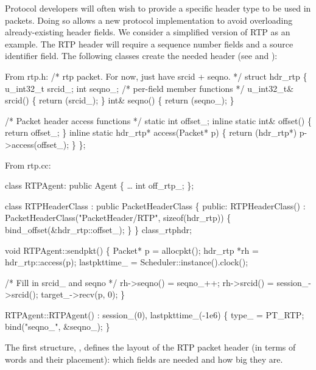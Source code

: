 Protocol developers
will often wish to provide a specific header type to be used in packets.
Doing so allows a new protocol implementation
to avoid overloading already-existing header fields.
We consider a simplified version of RTP as an example.
The RTP header will require a sequence number fields and a source
identifier field.
The following classes create the needed header
(see  and ):
\begin{program}
{\rm From rtp.h:}
        /* {\cf rtp packet.  For now, just have srcid + seqno.} */
        struct hdr_rtp \{ 
                u_int32_t srcid_;
                int seqno_;
                /* {\cf per-field member functions } */
                u_int32_t& srcid() \{ return (srcid_); \}
                int& seqno() \{ return (seqno_); \}

                /* {\cf Packet header access functions} */
                static int offset_;
                inline static int& offset() \{ return offset_; \}
                inline static hdr_rtp* access(Packet* p) \{
                        return (hdr_rtp*) p->access(offset_);
                \}
        \};

{\rm From rtp.cc:}

        class RTPAgent: public Agent \{
                \ldots
                int off_rtp_;
        \};

        class RTPHeaderClass : public PacketHeaderClass \{
        public: 
                RTPHeaderClass() : PacketHeaderClass("PacketHeader/RTP",
                                                     sizeof(hdr_rtp)) \{
                        bind_offset(&hdr_rtp::offset_);
                \}
        \} class_rtphdr;

        void RTPAgent::sendpkt()
        \{
                Packet* p = allocpkt();
                hdr_rtp *rh = hdr_rtp::access(p);
                lastpkttime_ = Scheduler::instance().clock();

                /* {\cf Fill in srcid_ and seqno} */
                rh->seqno() = seqno_++;
                rh->srcid() = session_->srcid();
                target_->recv(p, 0);
        \}

        RTPAgent::RTPAgent()
                : session_(0), lastpkttime_(-1e6)
        \{
                type_ = PT_RTP;
                bind("seqno_", &seqno_);
        \}
\end{program}
The first structure, , defines the layout
of the RTP packet header (in terms of words and their placement):
which fields are needed and how big they are.
